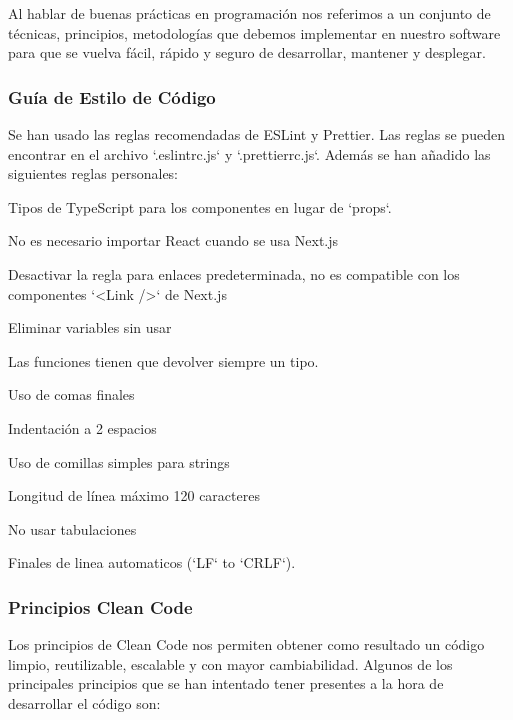 \documentclass[12pt,twoside,titlepage]{report}
\begin{document}
Al hablar de buenas prácticas en programación nos referimos a un conjunto de técnicas, principios, metodologías que debemos implementar en nuestro software para que se vuelva fácil, rápido y seguro de desarrollar, mantener y desplegar.

\subsubsection{Guía de Estilo de Código}

Se han usado las reglas recomendadas de ESLint y Prettier. Las reglas se pueden encontrar en el archivo `.eslintrc.js` y `.prettierrc.js`. Además se han añadido las siguientes reglas personales:

\begin{compactitem}
    \item Tipos de TypeScript para los componentes en lugar de `props`.
    \item No es necesario importar React cuando se usa Next.js
    \item Desactivar la regla para enlaces predeterminada, no es compatible con los componentes `<Link />` de Next.js
    \item Eliminar variables sin usar
    \item Las funciones tienen que devolver siempre un tipo.
    \item Uso de comas finales
    \item Indentación a 2 espacios
    \item Uso de comillas simples para strings
    \item Longitud de línea máximo 120 caracteres
    \item No usar tabulaciones
    \item Finales de linea automaticos (`LF` to `CRLF`).
\end{compactitem}

\subsubsection{Principios Clean Code}

Los principios de Clean Code nos permiten obtener como resultado un código limpio, reutilizable, escalable y con mayor cambiabilidad. Algunos de los principales principios que se han intentado tener presentes a la hora de desarrollar el código son:
\end{document}
